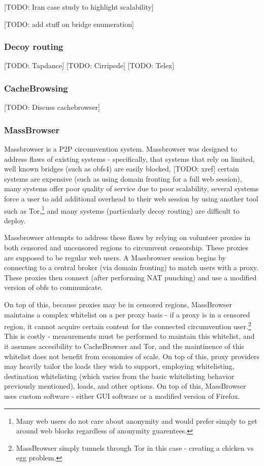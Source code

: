 \documentclass[12pt]{report}
\begin{document}
[TODO: Iran case study to highlight scalability]

[TODO: add stuff on bridge enumeration]

\subsubsection{Decoy routing}

[TODO: Tapdance] [TODO: Cirripede] [TODO: Telex]

\subsubsection{CacheBrowsing}

[TODO: Discuss cachebrowser]

\subsubsection{MassBrowser}

Massbrowser is a P2P circumvention system. Massbrowser was designed to address flaws of existing systems - specifically, that systems that rely on limited, well known bridges (such as obfs4) are easily blocked, [TODO: xref] certain systems are expensive (such as using domain fronting for a full web session), many systems offer poor quality of service due to poor scalability, several systems force a user to add additional overhead to their web session by using another tool such as Tor,\footnote{Many web users do not care about anonymity and would prefer simply to get around web blocks regardless of anonymity guarentees.} and many systems (particularly decoy routing) are difficult to deploy.\cite{massbrowser}

Massbrowser attempts to address these flaws by relying on volunteer proxies in both censored and uncensored regions to circumvent censorship. These proxies are supposed to be regular web users. A Massbrowser session begins by connecting to a central broker (via domain fronting) to match users with a proxy. These proxies then connect (after performing NAT punching) and use a modified version of obfs to communicate.

On top of this, because proxies may be in censored regions, MassBrowser maintains a complex whitelist on a per proxy basis - if a proxy is in a censored region, it cannot acquire certain content for the connected circumvention user.\footnote{MassBrowser simply tunnels through Tor in this case - creating a chicken vs egg problem.} This is costly - measurements must be performed to maintain this whitelist, and it assumes accesibility to CacheBrowser and Tor, and the maintinence of this whitelist does not benefit from economies of scale. On top of this, proxy providers may heavily tailor the loads they wish to support, employing whitelisting, destination whitelisting (which varies from the basic whitelisting behavior previously mentioned), loads, and other options.\cite{massbrowser} On top of this, MassBrowser uses custom software - either GUI software or a modified version of Firefox.
\end{document}
